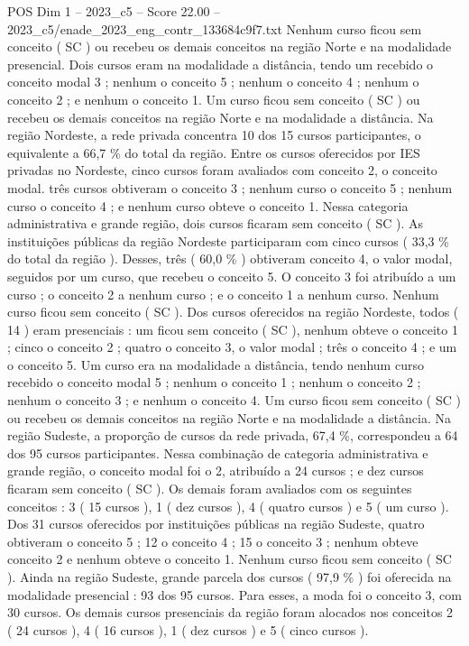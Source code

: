\begin{textsample}{POS Dim 1 – 2023\_c5 – Score 22.00 – 2023\_c5/enade\_2023\_eng\_contr\_133684c9f7.txt}
Nenhum curso ficou sem conceito ( SC ) ou recebeu os demais conceitos na região Norte e na modalidade presencial.
Dois cursos eram na modalidade a distância, tendo um recebido o conceito modal 3 ; nenhum o conceito 5 ; nenhum o conceito 4 ; nenhum o conceito 2 ; e nenhum o conceito 1.
Um curso ficou sem conceito ( SC ) ou recebeu os demais conceitos na região Norte e na modalidade a distância.
Na região Nordeste, a rede privada concentra 10 dos 15 cursos participantes, o equivalente a 66,7 \% do total da região.
Entre os cursos oferecidos por IES privadas no Nordeste, cinco cursos foram avaliados com conceito 2, o conceito modal. três cursos obtiveram o conceito 3 ; nenhum curso o conceito 5 ; nenhum curso o conceito 4 ; e nenhum curso obteve o conceito 1.
Nessa categoria administrativa e grande região, dois cursos ficaram sem conceito ( SC ).
As instituições públicas da região Nordeste participaram com cinco cursos ( 33,3 \% do total da região ).
Desses, três ( 60,0 \% ) obtiveram conceito 4, o valor modal, seguidos por um curso, que recebeu o conceito 5.
O conceito 3 foi atribuído a um curso ; o conceito 2 a nenhum curso ; e o conceito 1 a nenhum curso.
Nenhum curso ficou sem conceito ( SC ).
Dos cursos oferecidos na região Nordeste, todos ( 14 ) eram presenciais : um ficou sem conceito ( SC ), nenhum obteve o conceito 1 ; cinco o conceito 2 ; quatro o conceito 3, o valor modal ; três o conceito 4 ; e um o conceito 5.
Um curso era na modalidade a distância, tendo nenhum curso recebido o conceito modal 5 ; nenhum o conceito 1 ; nenhum o conceito 2 ; nenhum o conceito 3 ; e nenhum o conceito 4.
Um curso ficou sem conceito ( SC ) ou recebeu os demais conceitos na região Norte e na modalidade a distância.
Na região Sudeste, a proporção de cursos da rede privada, 67,4 \%, correspondeu a 64 dos 95 cursos participantes.
Nessa combinação de categoria administrativa e grande região, o conceito modal foi o 2, atribuído a 24 cursos ; e dez cursos ficaram sem conceito ( SC ).
Os demais foram avaliados com os seguintes conceitos : 3 ( 15 cursos ), 1 ( dez cursos ), 4 ( quatro cursos ) e 5 ( um curso ).
Dos 31 cursos oferecidos por instituições públicas na região Sudeste, quatro obtiveram o conceito 5 ; 12 o conceito 4 ; 15 o conceito 3 ; nenhum obteve conceito 2 e nenhum obteve o conceito 1.
Nenhum curso ficou sem conceito ( SC ).
Ainda na região Sudeste, grande parcela dos cursos ( 97,9 \% ) foi oferecida na modalidade presencial : 93 dos 95 cursos.
Para esses, a moda foi o conceito 3, com 30 cursos.
Os demais cursos presenciais da região foram alocados nos conceitos 2 ( 24 cursos ), 4 ( 16 cursos ), 1 ( dez cursos ) e 5 ( cinco cursos ).

\end{textsample}
